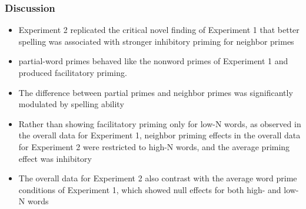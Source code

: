 \documentclass[]{article}
\begin{document}
			\subsubsection{Discussion}
			\begin{itemize}
				\item Experiment 2 replicated the critical novel finding of Experiment 1 that better spelling was associated with stronger inhibitory priming for neighbor primes
				\item partial-word primes behaved like the nonword primes of Experiment 1 and produced facilitatory priming.
				\item The difference between partial primes and neighbor primes was significantly modulated by spelling ability
				\item Rather than showing facilitatory priming only for low-N words, as observed in the overall data for Experiment 1, neighbor priming effects in the overall data for Experiment 2 were restricted to high-N words, and the average priming effect was inhibitory
				\item The overall data for Experiment 2 also contrast with the average word prime conditions of Experiment 1, which showed null effects for both high- and low-N words		
			\end{itemize}	
	
\end{document}
